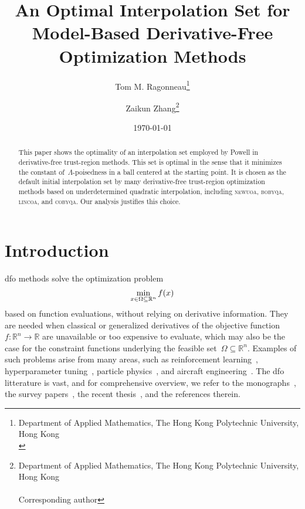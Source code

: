 \documentclass[draft]{article}
\title{An Optimal Interpolation Set for Model-Based Derivative-Free Optimization Methods}
\author{
    Tom M. Ragonneau\thanks{
        Department of Applied Mathematics, The Hong Kong Polytechnic University, Hong Kong\\
        \email{tom.ragonneau@polyu.edu.hk} \quad \website[globe-asia]{www.tomragonneau.com}
    }\orcid{0000-0003-2717-2876} \and
    Zaikun Zhang\thanks{
        Department of Applied Mathematics, The Hong Kong Polytechnic University, Hong Kong\\
        \email{zaikun.zhang@polyu.edu.hk} \quad \website[globe-asia]{www.zhangzk.net}\\
        Corresponding author
    }\orcid{0000-0001-8934-8190}
}
\date{\today}
\numberwithin{equation}{section}
\theoremstyle{definition}
\theoremstyle{plain}
\theoremstyle{remark}
\newcommand*{\fset}{\Omega}
\newcommand*{\obj}{f}
\newcommand*{\R}{\mathbb{R}}
\newcommand*{\solvername}[1]{\textsc{#1}\xspace}
\begin{document}
\maketitle

\begin{abstract}
    This paper shows the optimality of an interpolation set employed by Powell in derivative-free trust-region methods.
    This set is optimal in the sense that it minimizes the constant of~$\Lambda$-poisedness in a ball centered at the starting point.
    It is chosen as the default initial interpolation set by many derivative-free trust-region optimization methods based on underdetermined quadratic interpolation, including \solvername{newuoa}, \solvername{bobyqa}, \solvername{lincoa}, and \solvername{cobyqa}.
    Our analysis justifies this choice.
\end{abstract}



\section{Introduction}

\Gls{dfo} methods solve the optimization problem
\begin{equation}
    \label{eq:nlp}
    \min_{x \in \fset \subseteq \R^n} \obj(x)\\
\end{equation}
based on function evaluations, without relying on derivative information.
They are needed when classical or generalized derivatives of the objective function~$\obj \colon \R^n \to \R$ are unavailable or too expensive to evaluate, which may also be the case for the constraint functions underlying the feasible set~$\fset \subseteq \R^n$.
Examples of such problems arise from many areas, such as reinforcement learning~\cite{Qian_Yu_2021}, hyperparameter tuning~\cite{Ghanbari_Scheinberg_2017}, particle physics~\cite{Eldred_Etal_2022}, and aircraft engineering~\cite{Gazaix_Etal_2019}.
The \gls{dfo} litterature is vast, and for comprehensive overview, we refer to the monographs~\cite{Conn_Scheinberg_Vicente_2009,Audet_Hare_2017}, the survey papers~\cite{Powell_1975,Powell_1998,Rios_Sahinidis_2013,Custodio_Scheinberg_Vicente_2017,Larson_Menickelly_Wild_2019}, the recent thesis~\cite{Ragonneau_2022}, and the references therein.
\end{document}
